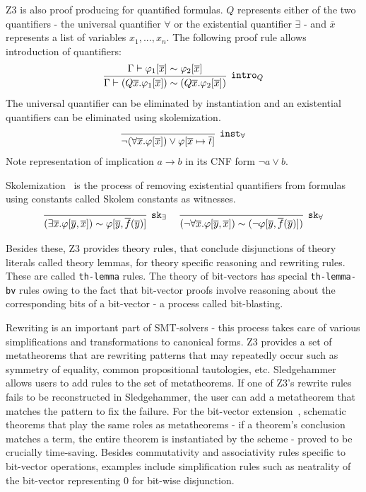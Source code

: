 \documentclass{article}
\begin{document}
		Z3 is also proof producing for quantified formulas.
		$Q$ represents either of the two quantifiers - 
		the universal quantifier $\forall$ or the 
		existential quantifier $\exists$ - and 
		$\overline{x}$ represents a list of variables 
		$x_1,...,x_n$. The following 
		proof rule allows introduction of quantifiers:
		\begin{equation*}
			\infer[\texttt{intro$_Q$}]
			{\Gamma \vdash (Q \overline{x}.\varphi_1 [ \overline{x}]) \sim (Q \overline{x}.\varphi_2 [ \overline{x}])}
			{\Gamma \vdash \varphi_1 [\overline{x}] \sim \varphi_2 [\overline{x}]}
		\end{equation*}
		The universal quantifier can be eliminated by 
		instantiation and an existential quantifiers 
		can be eliminated using skolemization.
		\begin{equation*}
		\infer[\texttt{inst$_\forall$}]
			{\neg(\forall\overline{x}.\varphi[\overline{x}])
			\lor \varphi[\overline{x} \mapsto \overline{t}]}
			{}
		\end{equation*}
		Note representation of implication $a \to b$ in its 
		CNF form $\neg a \lor b$.
		
		Skolemization~\cite{NONNENGART2001335} is the process 
		of removing existential quantifiers from formulas using 
		constants called Skolem constants as witnesses.
		\begin{equation*}
		\infer[\texttt{sk$_\exists$}]
			{(\exists\overline{x}.\varphi[\overline{y},\overline{x}]) 
			\sim \varphi[\overline{y},\overline{f}(\overline{y})]}
			{}\ \ \ \ 
		\infer[\texttt{sk$_\forall$}]
		{(\neg\forall\overline{x}.\varphi[\overline{y},\overline{x}]) 
			\sim (\neg \varphi[\overline{y},\overline{f}(\overline{y})])}
		{}	
		\end{equation*}
		
		Besides these, Z3 provides theory rules, 
		that conclude disjunctions of theory literals 
		called theory lemmas, for theory specific reasoning
		and rewriting rules. These are called 
		\texttt{th-lemma} rules. The theory of bit-vectors
		has special \texttt{th-lemma-bv} rules owing to 
		the fact that bit-vector proofs involve reasoning 
		about the corresponding bits of a bit-vector - 
		a process called bit-blasting. 
		
		Rewriting is an important part of SMT-solvers - 
		this process takes 
		care of various simplifications and 
		transformations to canonical forms. Z3 
		provides a set of metatheorems that are 
		rewriting patterns that may repeatedly 
		occur such as symmetry of equality, common 
		propositional tautologies, etc. Sledgehammer
		allows users to add rules to the set of 
		metatheorems. If one of Z3's rewrite rules 
		fails to be reconstructed in Sledgehammer, 
		the user can add a metatheorem that 
		matches the pattern to fix the failure.
		For the bit-vector 
		extension~\cite{10.1007/978-3-642-25379-9_15}, 
		schematic theorems that play the same roles 
		as metatheorems - if a theorem's conclusion 
		matches a term, the entire theorem is 
		instantiated by the scheme - proved to 
		be crucially time-saving. Besides commutativity 
		and associativity rules specific to bit-vector
		operations, examples include simplification 
		rules such as neatrality of the bit-vector 
		representing $0$ for bit-wise disjunction.
		
\end{document}
